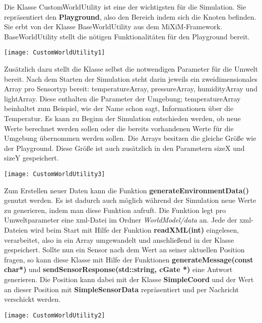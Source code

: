 Die Klasse CustomWorldUtility ist eine der wichtigsten für die Simulation. Sie repräsentiert den \textbf{Playground}, also den Bereich indem sich die Knoten befinden. Sie erbt von der Klasse BaseWorldUtility aus dem MiXiM-Framework. BaseWorldUtility stellt die nötigen Funktionalitäten für den Playground bereit. \newline

\begin{center}
\texttt{[image: CustomWorldUtility1]}
\end{center}

Zusätzlich dazu stellt die Klasse selbst die notwendigen Parameter für die Umwelt bereit. Nach dem Starten der Simulation steht darin jeweils ein zweidimensionales Array pro Sensortyp bereit: temperatureArray, pressureArray, humidityArray und lightArray. Diese enthalten die Parameter der Umgebung; temperatureArray beinhaltet zum Beispiel, wie der Name schon sagt, Informationen über die Temperatur. \newline
Es kann zu Beginn der Simulation entschieden werden, ob neue Werte berechnet werden sollen oder die bereits vorhandenen Werte für die Umgebung übernommen werden sollen. Die Arrays besitzen die gleiche Größe wie der Playground. Diese Größe ist auch zusätzlich in den Parametern sizeX und sizeY gespeichert.

\begin{center}
\texttt{[image: CustomWorldUtility3]}
\end{center}

Zum Erstellen neuer Daten kann die Funktion \textbf{generateEnvironmentData()} genutzt werden. Es ist dadurch auch möglich während der Simulation neue Werte zu generieren, indem man diese Funktion aufruft. Die Funktion legt pro Umweltparameter eine xml-Datei im Ordner \textit{WorldModel/data} an. Jede der xml-Dateien wird beim Start mit Hilfe der Funktion \textbf{readXML(int)} eingelesen, verarbeitet, also in ein Array umgewandelt und anschließend in der Klasse gespeichert. \newline
Sollte nun ein Sensor nach dem Wert an seiner aktuellen Position fragen, so kann diese Klasse mit Hilfe der Funktionen \textbf{generateMessage(const char*)} und \textbf{sendSensorResponse(std::string, cGate *)} eine Antwort generieren. Die Position kann dabei mit der Klasse \textbf{SimpleCoord} und der Wert an dieser Position mit \textbf{SimpleSensorData} repräsentiert und per Nachricht verschickt werden.

\begin{center}
\texttt{[image: CustomWorldUtility2]}
\end{center}

